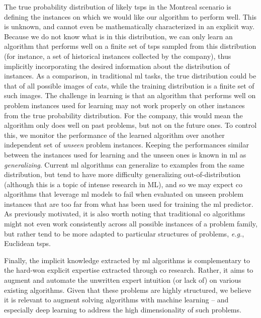 \documentclass[11pt]{article}
\begin{document}
		The true probability distribution of likely \glspl{tsp} in the Montreal scenario is defining the
		instances on which we would like our algorithm to perform well.
		This is unknown, and cannot even be mathematically characterized in an explicit way.
		Because we do not know what is in this distribution, we can only learn an algorithm that performs
		well on a finite set of \glspl{tsp} sampled from this distribution (for instance, a set of
		historical instances collected by the company), thus implicitly incorporating the desired information about the distribution of instances.
		As a comparison, in traditional \gls{ml} tasks, the true distribution could be that of all possible
		images of cats, while the training distribution is a finite set of such images.
		The challenge in learning is that an algorithm that performs well on problem instances used for
		learning may not work properly on other instances from the true probability distribution.
		For the company, this would mean the algorithm only does well on past problems, but
		not on the future ones.
		To control this, we monitor the performance of the learned algorithm over another independent set
		of \emph{unseen} problem instances.
		Keeping the performances similar between the instances used for learning and the unseen ones is
		known in \gls{ml} as \emph{generalizing}.
		Current \gls{ml} algorithms can generalize to examples from the same distribution, but tend to have
		more difficulty generalizing out-of-distribution (although this is a topic of intense research in ML), and so we may expect \gls{co} algorithms that
		leverage \gls{ml} models to fail when evaluated on unseen problem instances that are too far from
		what has been used for training the \gls{ml} predictor.
		As previously motivated, it is also worth noting that traditional \gls{co} algorithms might not
		even work consistently across all possible instances of a problem family, but rather tend to be
		more adapted to particular structures of problems, \textit{e.g.}, Euclidean \glspl{tsp}.

		Finally, the implicit knowledge extracted by \gls{ml} algorithms is complementary to the hard-won
		explicit expertise extracted through \gls{co} research.
		Rather, it aims to augment and automate the unwritten expert intuition (or lack of) on various
		existing algorithms.
		Given that these problems are highly structured, we believe it is relevant to augment
		solving algorithms with machine learning -- and especially deep learning to address the high
		dimensionality of such problems.
\end{document}
